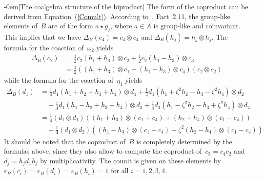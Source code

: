\documentclass{article}
\makeatletter
\renewcommand{\subsection}{\@startsection{subsection}{2}{0em}%
{\baselineskip}{-0em}{\bfseries\normalsize}}
\numberwithin{equation}{section}
\theoremstyle{definition}
\theoremstyle{break}
\newcommand{\ot}{\mathbin{\otimes}}
\newcommand{\1}{{(1)}}
\newcommand{\2}{{(2)}}
\newcommand{\3}{{(3)}}
\newcommand{\db}{\Delta_{B}}
\newcommand{\eb}{{\varepsilon_{B}}}
\makeatother
\begin{document}
\subsection[The coalgebra structure of the biproduct]{} \label{CoalgBiprod}
The form of the coproduct can be derived from Equation~(\ref{Comult}). According to~\cite{RadfProj}, Fact~2.11, the group-like elements of~$B$ are of the form $a \star g_j$, where $a \in A$ is group-like and coinvariant. This implies that we have $\Delta_B(c_4) = c_4 \ot c_4$ and $\Delta _B(h_j) = h_j \ot h_j$. The formula for the coaction of~$\omega_2$ yields 
\begin{align*}
\db(c_2) &= \frac{1}{2} c_2(h_1 + h_3) \ot c_2 + \frac{1}{2} c_2(h_1 - h_3) \ot c_3 \\
&= \frac{1}{2}\left( (h_1 + h_3) \ot c_1 + (h_1 - h_3) \ot c_4 \right)\left( c_2 \ot c_2\right)
\end{align*}
while the formula for the coaction of~$\eta_1$ yields
\begin{align*}
\db(d_1) &= \frac{1}{4}d_1(h_1 + h_2 + h_3 + h_4) \ot d_1
+ \frac{1}{4} d_1 (h_1 + \zeta^2 h_2 - h_3 - \zeta^2 h_4) \ot d_2 \\
&\quad + \frac{1}{4} d_1 (h_1 - h_2 + h_3 - h_4) \ot d_3
+ \frac{1}{4} d_1 (h_1 - \zeta^2 h_2 - h_3 + \zeta^2 h_4) \ot d_4 \\
&= \frac{1}{4} \left( d_1 \ot d_1\right) \left((h_1+h_3) \ot (c_1 + c_4)
+ (h_2+h_4) \ot  (c_1 - c_4) \right)  \\
&\quad +\frac{1}{4} \left( d_1 \ot d_2 \right)
\left((h_1 - h_3) \ot (c_1 + c_4) + \zeta^2(h_2 - h_4) \ot (c_1 - c_4)  \right)
\end{align*}
It should be noted that the coproduct of~$B$ is completely determined by the formulas above, since they also allow to compute the coproduct of~$c_3 = c_4 c_2$ and~$d_j = h_j d_1 h_j$ by multiplicativity. The counit is given on these elements by~$\eb(c_i) = \eb(d_i) = \eb(h_i) = 1$ for all $i=1,2,3,4$.
\end{document}
